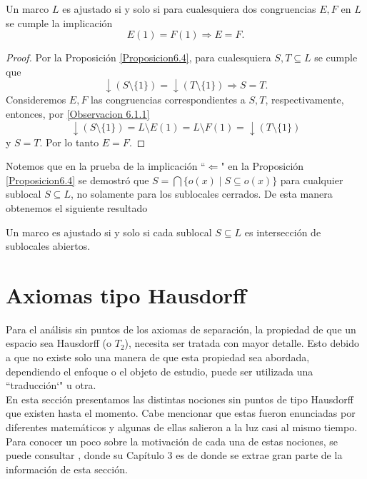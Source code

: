 \begin{thm}\label{Teorema6.5}
    Un marco $L$ es ajustado si y solo si para cualesquiera dos congruencias $E, F$ en $L$ se cumple la implicación
    \[
    E(1)=F(1)\Rightarrow E=F.
    \]

    \begin{proof}
        Por la Proposición \ref{Proposicion6.4}, para cualesquiera $S, T\subseteq L$ se cumple que 
        \[
        \downarrow(S\setminus \{1\})=\downarrow(T\setminus \{1\})\Rightarrow S=T.
        \]
        Consideremos $E, F$ las congruencias correspondientes a $S, T$, respectivamente, entonces, por \ref{Observacion 6.1.1}
        \[
        \downarrow (S\setminus \{1\})=L\setminus E(1)=L\setminus F(1)=\downarrow (T\setminus \{1\})
        \]
        y $S=T$. Por lo tanto $E=F$.
    \end{proof}
\end{thm}


Notemos que en la prueba de la implicación ``$\Leftarrow$" en la Proposición \ref{Proposicion6.4} se demostró que $S=\bigcap\{o(x)\mid S\subseteq o(x)\}$ para cualquier sublocal $S\subseteq L$, no solamente para los sublocales cerrados. De esta manera obtenemos el siguiente resultado

\begin{thm}
    Un marco es ajustado si y solo si cada sublocal $S\subseteq L$ es intersección de sublocales abiertos.
\end{thm}

\section{Axiomas tipo Hausdorff}

Para el análisis sin puntos de los axiomas de separación, la propiedad de que un espacio sea Hausdorff (o $T_2$), necesita ser tratada con mayor detalle. Esto debido a que no existe solo una manera de que esta propiedad sea abordada, dependiendo el enfoque o el objeto de estudio, puede ser utilizada una ``traducción`" u otra.\\

En esta sección presentamos las distintas nociones sin puntos de tipo Hausdorff que existen hasta el momento. Cabe mencionar que estas fueron enunciadas por diferentes matemáticos y algunas de ellas salieron a la luz casi al mismo tiempo. Para conocer un poco sobre la motivación de cada una de estas nociones, se puede consultar \cite{J.P.2}, donde su Capítulo 3 es de donde se extrae gran parte de la información de esta sección.\\

